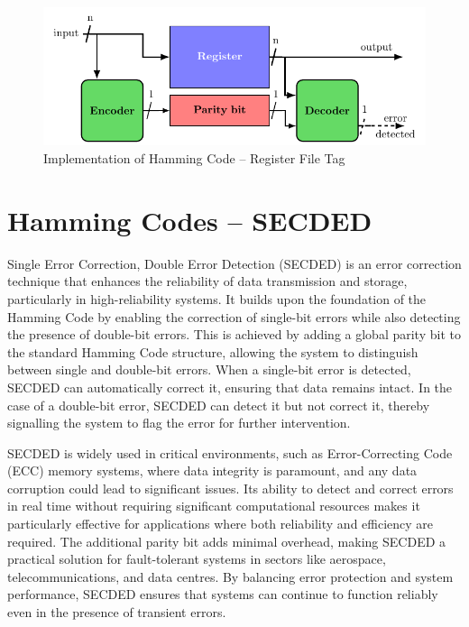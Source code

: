 \begin{figure}[ht]
    \centering
    \includegraphics[page=3, width=\textwidth]{c5_countermeasures_dift/img/archi_contremesures.pdf}
    \caption{Implementation of Hamming Code -- Register File Tag}
    \label{fig:implementation_hc_2}
\end{figure}


\section{Hamming Codes -- SECDED}
\label{section:chap5_secded}

Single Error Correction, Double Error Detection (SECDED) is an error correction technique that enhances the reliability of data transmission and storage, particularly in high-reliability systems. It builds upon the foundation of the Hamming Code by enabling the correction of single-bit errors while also detecting the presence of double-bit errors. This is achieved by adding a global parity bit to the standard Hamming Code structure, allowing the system to distinguish between single and double-bit errors. When a single-bit error is detected, SECDED can automatically correct it, ensuring that data remains intact. In the case of a double-bit error, SECDED can detect it but not correct it, thereby signalling the system to flag the error for further intervention.

SECDED is widely used in critical environments, such as Error-Correcting Code (ECC) memory systems, where data integrity is paramount, and any data corruption could lead to significant issues. Its ability to detect and correct errors in real time without requiring significant computational resources makes it particularly effective for applications where both reliability and efficiency are required. The additional parity bit adds minimal overhead, making SECDED a practical solution for fault-tolerant systems in sectors like aerospace, telecommunications, and data centres. By balancing error protection and system performance, SECDED ensures that systems can continue to function reliably even in the presence of transient errors.

